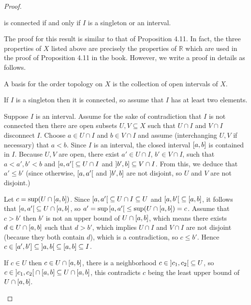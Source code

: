 \begin{proof}
\begin{enumerate}[label={(\alph*)}]
		      is connected if and only if $I$ is a singleton or an interval.

		      The proof for this result is similar to that of Proposition 4.11. In fact, the three properties of $X$ listed above are precisely the properties of $\mathbb{R}$ which are used in the proof of Proposition 4.11 in the book. However, we write a proof in details as follows.

		      A basis for the order topology on $X$ is the collection of open intervals of $X$.

		      If $I$ is a singleton then it is connected, so assume that $I$ has at least two elements.

		      Suppose $I$ is an interval. Assume for the sake of contradiction that $I$ is not connected then there are open subsets $U, V\subseteq X$ such that $U\cap I$ and $V\cap I$ disconnect $I$. Choose $a \in U\cap I$ and $b\in V\cap I$ and assume (interchanging $U, V$ if necessary) that $a < b$. Since $I$ is an interval, the closed interval $\left[{a, b}\right]$ is contained in $I$. Because $U, V$ are open, there exist $a'\in U\cap I$, $b'\in V\cap I$, such that $a < a', b' < b$ and $\left[{a, a'}\right[ \subseteq U\cap I$ and $\left]{b', b}\right]\subseteq V\cap I$. From this, we deduce that $a' \leq b'$ (since otherwise, $\left[{a, a'}\right[$ and $\left]{b', b}\right]$ are not disjoint, so $U$ and $V$ are not disjoint.)

		      Let $c = \sup (U\cap \left[{a, b}\right])$. Since $\left[{a, a'}\right[ \subseteq U\cap I \subseteq U$ and $\left[{a, b'}\right[ \subseteq \left[{a, b}\right]$, it follows that $\left[{a, a'}\right[ \subseteq U\cap \left[{a, b}\right]$, so $a' = \sup\left[{a, a'}\right[ \leq \sup (U\cap \left[{a, b}\right]) = c$. Assume that $c > b'$ then $b'$ is not an upper bound of $U\cap\left[{a, b}\right]$, which means there exists $d \in U\cap\left[{a, b}\right]$ such that $d > b'$, which implies $U\cap I$ and $V\cap I$ are not disjoint (because they both contain $d$), which is a contradiction, so $c\leq b'$. Hence $c \in \left[{a', b'}\right] \subseteq \left]{a, b}\right[ \subseteq \left[{a, b}\right] \subseteq I$.

		      If $c\in U$ then $c\in U\cap\left[{a, b}\right]$, there is a neighborhood $c\in \left]{c_{1}, c_{2}}\right[ \subseteq U$, so $c\in \left]{c_{1}, c_{2}}\right[ \cap \left[{a, b}\right] \subseteq U\cap\left[{a, b}\right]$, this contradicts $c$ being the least upper bound of $U\cap\left[{a, b}\right]$.


\end{enumerate}
\end{proof}
